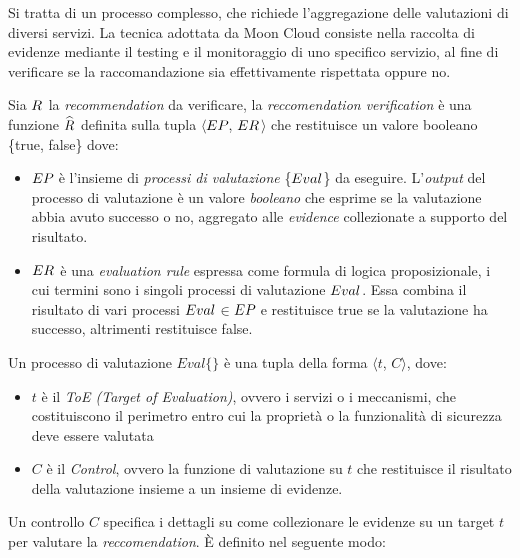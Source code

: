 \documentclass[../main.tex]{subfiles}
\begin{document}
Si tratta di un processo complesso, che richiede l'aggregazione delle valutazioni di diversi servizi. La tecnica adottata da Moon Cloud consiste nella raccolta di evidenze mediante il testing e il monitoraggio di uno specifico servizio, al fine di verificare se la raccomandazione sia effettivamente rispettata oppure no\cite{MyPaper}.

\begin{definition}\label{def:prop}
    Sia $R_{}\/$ la \textit{recommendation} da verificare, la \textit{reccomendation verification} è una funzione  $\widehat{R_{}\/}$  definita sulla tupla $\langle$$EP_{}\/$, $ER_{}\/$$\rangle$ che restituisce un valore booleano \{true, false\} dove:

\begin{itemize}
    \item $EP_{}\/$ è l'insieme di \textit{processi di valutazione} \{$Eval_{}\/$\} da eseguire. L'\textit{output} del processo di valutazione è un valore \textit{booleano} che esprime se la valutazione abbia avuto successo o no, aggregato alle \textit{evidence} collezionate a supporto del risultato.
        \item $ER_{}\/$ è una \textit{evaluation rule} espressa come formula di logica proposizionale, i cui termini sono i singoli processi di valutazione $Eval_{}\/$. Essa combina il risultato di vari processi $Eval_{}\/$$\in$$EP_{}\/$ e restituisce true se la valutazione ha successo, altrimenti restituisce false.
\end{itemize}
\end{definition}
\begin{definition}\label{def:eval}
    Un processo di valutazione\cite{MyPaper} $Eval\{\}$ è una tupla della forma $\langle$$t$, $C$$\rangle$, dove:
\begin{itemize}
	\item $t$ è il \emph{ToE (Target of Evaluation)}, ovvero i servizi o i meccanismi, che costituiscono il perimetro entro cui la proprietà o la funzionalità di sicurezza deve essere valutata
	\item $C$ è il \emph{Control}, ovvero la funzione di valutazione su $t$ che restituisce il risultato della valutazione insieme a un insieme di evidenze.
\end{itemize}
\end{definition}

Un controllo $C$ specifica i dettagli su come collezionare le evidenze su un target $t$ per valutare la \textit{reccomendation}. È definito nel seguente modo\cite{MyPaper}:
\end{document}
